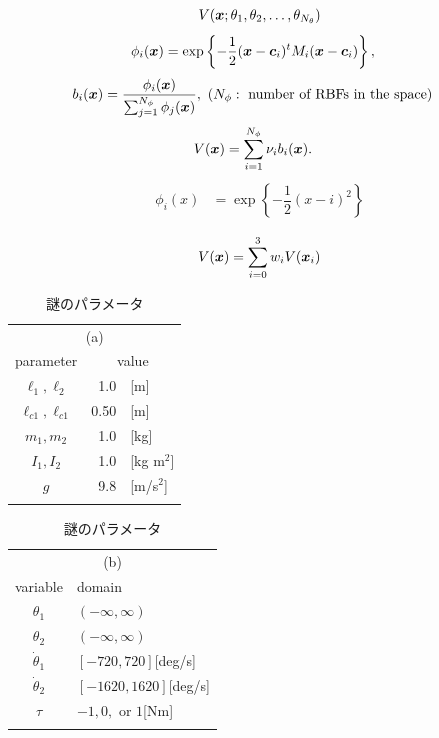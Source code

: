 \begin{align}
V(\boldsymbol{x};\theta_1,\theta_2,\dots,\theta_{N_\theta}) \nonumber
\end{align}
\begin{align}
\phi_i(\boldsymbol{x}) &= \exp \left\{-\dfrac{1}{2}(\boldsymbol{x} - \boldsymbol{c}_i)^t M_i (\boldsymbol{x} - \boldsymbol{c}_i) \right\},
\end{align}
\begin{align}
b_i(\boldsymbol{x}) &= \dfrac{\phi_i(\boldsymbol{x})}{\sum_{j=1}^{N_\phi} \phi_j(\boldsymbol{x})}, \ (N_\phi: \text{ number of RBFs in the space})
\end{align}
\begin{align}
V(\boldsymbol{x}) &= \sum_{i=1}^{N_\phi} \nu_i b_i(\boldsymbol{x}). \label{eq:rbf_weighted_sum}
\end{align}
\begin{align}
\phi_i(x) &= \exp \left\{-\dfrac{1}{2}(x - i)^2 \right\} \nonumber
\end{align}

\begin{align}
V(\boldsymbol{x}) = \sum_{i=0}^3 w_i V(\boldsymbol{x}_i)
\end{align}


\begin{table}[htbp]
        \begin{center}
	\caption{謎のパラメータ}
        \label{table:parameter_value}
\begin{footnotesize}
\begin{minipage}{12em}
        \begin{tabular}{c|rl}
\multicolumn{3}{c}{(a)}\\
        \thline
parameter & \multicolumn{2}{c}{value} \\
        \hline
$\ell_1,\ell_2$ & 1.0&[m] \\
$\ell_{c1},\ell_{c1}$ & 0.50&[m] \\
$m_1,m_2$ & 1.0&[kg] \\
$I_1,I_2$ & 1.0&[kg m$^2$] \\
$g$ & 9.8&[m/s$^2$] \\
   \thline
  \end{tabular}
\end{minipage}
\hspace{2em}
\begin{minipage}{12em}
        \begin{tabular}{c|l}
\multicolumn{2}{c}{(b)}\\
        \thline
variable & domain \\
        \hline
$\theta_1$ & $(-\infty,\infty)$ \\
$\theta_2$ & $(-\infty,\infty)$ \\
$\dot\theta_1$ & $[-720,720]$[deg/s] \\
$\dot\theta_2$ & $[-1620,1620]$[deg/s] \\
\hline
$\tau$ & $-1,0,$ or $1$[Nm] \\
   \thline
  \end{tabular}
\end{minipage}
\end{footnotesize}
  \end{center}
\end{table}


